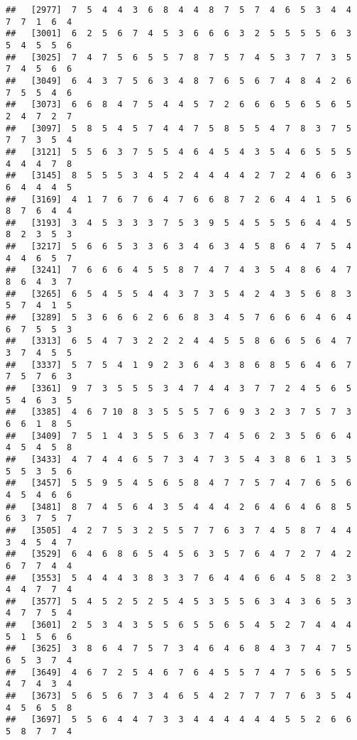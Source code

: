 \documentclass[
]{book}
\begin{document}
\begin{verbatim}
##   [2977]  7  5  4  4  3  6  8  4  4  8  7  5  7  4  6  5  3  4  4  7  7  1  6  4
##   [3001]  6  2  5  6  7  4  5  3  6  6  6  3  2  5  5  5  5  6  3  5  4  5  5  6
##   [3025]  7  4  7  5  6  5  5  7  8  7  5  7  4  5  3  7  7  3  5  7  4  5  6  6
##   [3049]  6  4  3  7  5  6  3  4  8  7  6  5  6  7  4  8  4  2  6  7  5  5  4  6
##   [3073]  6  6  8  4  7  5  4  4  5  7  2  6  6  6  5  6  5  6  5  2  4  7  2  7
##   [3097]  5  8  5  4  5  7  4  4  7  5  8  5  5  4  7  8  3  7  5  7  7  3  5  4
##   [3121]  5  5  6  3  7  5  5  4  6  4  5  4  3  5  4  6  5  5  5  4  4  4  7  8
##   [3145]  8  5  5  5  3  4  5  2  4  4  4  4  2  7  2  4  6  6  3  6  4  4  4  5
##   [3169]  4  1  7  6  7  6  4  7  6  6  8  7  2  6  4  4  1  5  6  8  7  6  4  4
##   [3193]  3  4  5  3  3  3  7  5  3  9  5  4  5  5  5  6  4  4  5  8  2  3  5  3
##   [3217]  5  6  6  5  3  3  6  3  4  6  3  4  5  8  6  4  7  5  4  4  4  6  5  7
##   [3241]  7  6  6  6  4  5  5  8  7  4  7  4  3  5  4  8  6  4  7  8  6  4  3  7
##   [3265]  6  5  4  5  5  4  4  3  7  3  5  4  2  4  3  5  6  8  3  5  7  4  1  5
##   [3289]  5  3  6  6  6  2  6  6  8  3  4  5  7  6  6  6  4  6  4  6  7  5  5  3
##   [3313]  6  5  4  7  3  2  2  2  4  4  5  5  8  6  6  5  6  4  7  3  7  4  5  5
##   [3337]  5  7  5  4  1  9  2  3  6  4  3  8  6  8  5  6  4  6  7  7  5  7  6  3
##   [3361]  9  7  3  5  5  5  3  4  7  4  4  3  7  7  2  4  5  6  5  5  4  6  3  5
##   [3385]  4  6  7 10  8  3  5  5  5  7  6  9  3  2  3  7  5  7  3  6  6  1  8  5
##   [3409]  7  5  1  4  3  5  5  6  3  7  4  5  6  2  3  5  6  6  4  4  5  4  5  8
##   [3433]  4  7  4  4  6  5  7  3  4  7  3  5  4  3  8  6  1  3  5  5  5  3  5  6
##   [3457]  5  5  9  5  4  5  6  5  8  4  7  7  5  7  4  7  6  5  6  4  5  4  6  6
##   [3481]  8  7  4  5  6  4  3  5  4  4  4  2  6  4  6  4  6  8  5  6  3  7  5  7
##   [3505]  4  2  7  5  3  2  5  5  7  7  6  3  7  4  5  8  7  4  4  3  4  5  4  7
##   [3529]  6  4  6  8  6  5  4  5  6  3  5  7  6  4  7  2  7  4  2  6  7  7  4  4
##   [3553]  5  4  4  4  3  8  3  3  7  6  4  4  6  6  4  5  8  2  3  4  4  7  7  4
##   [3577]  5  4  5  2  5  2  5  4  5  3  5  5  6  3  4  3  6  5  3  4  7  7  5  4
##   [3601]  2  5  3  4  3  5  5  6  5  5  6  5  4  5  2  7  4  4  4  5  1  5  6  6
##   [3625]  3  8  6  4  7  5  7  3  4  6  4  6  8  4  3  7  4  7  5  6  5  3  7  4
##   [3649]  4  6  7  2  5  4  6  7  6  4  5  5  7  4  7  5  6  5  5  4  7  4  3  4
##   [3673]  5  6  5  6  7  3  4  6  5  4  2  7  7  7  7  6  3  5  4  4  5  6  5  8
##   [3697]  5  5  6  4  4  7  3  3  4  4  4  4  4  4  5  5  2  6  6  5  8  7  7  4

\end{verbatim}
\end{document}
